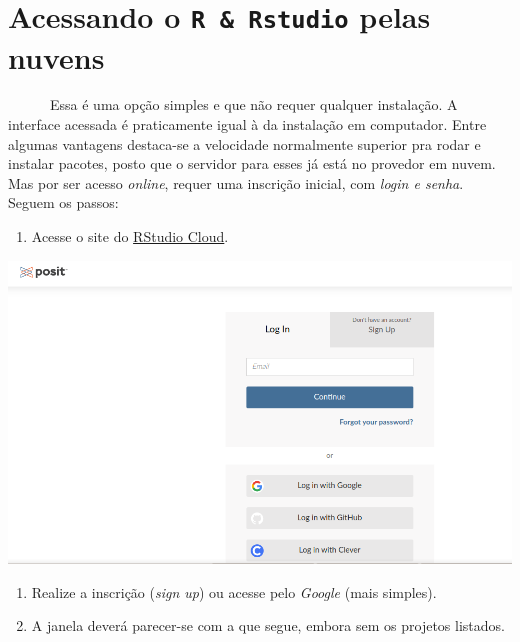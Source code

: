 \documentclass[
  letterpaper,
  DIV=11,
  numbers=noendperiod]{scrreprt}
\providecommand{\tightlist}{%
  \setlength{\itemsep}{0pt}\setlength{\parskip}{0pt}}\usepackage{longtable,booktabs,array}
\begin{document}
\section{\texorpdfstring{Acessando o \texttt{R\ \&\ Rstudio} pelas
nuvens}{Acessando o R \& Rstudio pelas nuvens}}\label{acessando-o-r-rstudio-pelas-nuvens}

~~~~~~Essa é uma opção simples e que não requer qualquer instalação. A
interface acessada é praticamente igual à da instalação em computador.
Entre algumas vantagens destaca-se a velocidade normalmente superior pra
rodar e instalar pacotes, posto que o servidor para esses já está no
provedor em nuvem. Mas por ser acesso \emph{online}, requer uma
inscrição inicial, com \emph{login e senha}. Seguem os passos:

\begin{enumerate}
\def\labelenumi{\arabic{enumi}.}
\tightlist
\item
  Acesse o site do
  \href{https://login.posit.cloud/login?redirect=\%2Foauth\%2Fauthorize\%3Fredirect_uri\%3Dhttps\%253A\%252F\%252Fposit.cloud\%252Flogin\%26client_id\%3Dposit-cloud\%26response_type\%3Dcode\%26show_auth\%3D0}{RStudio
  Cloud}.
\end{enumerate}

\includegraphics{rstudioNuvem.png}

\begin{enumerate}
\def\labelenumi{\arabic{enumi}.}
\setcounter{enumi}{1}
\item
  Realize a inscrição (\emph{sign up}) ou acesse pelo \emph{Google}
  (mais simples).
\item
  A janela deverá parecer-se com a que segue, embora sem os projetos
  listados.
\end{enumerate}
\end{document}
